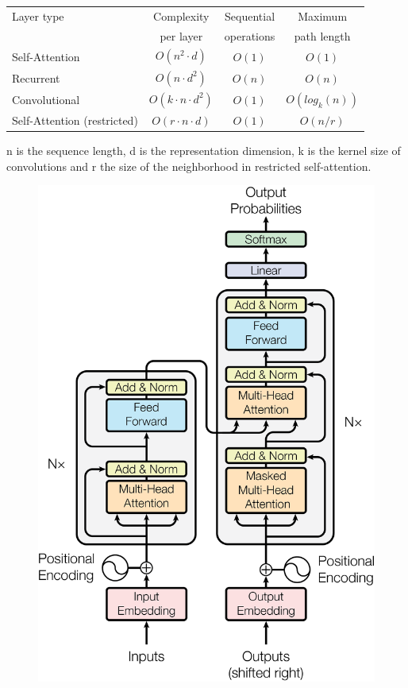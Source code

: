 \begin{table}
\centering
\begin{tabular}{l|ccc}
\toprule
Layer type        &   Complexity             &  Sequential & Maximum        \\
                  &   per layer              &  operations & path length    \\
\midrule
Self-Attention    & $O(n^2 \cdot d)$         & $O(1)$      & $O(1)$         \\
Recurrent         & $O(n \cdot d^2)$         & $O(n)$      & $O(n)$         \\
Convolutional     & $O(k \cdot n \cdot d^2)$ & $O(1)$      & $O(log_k (n))$ \\
Self-Attention (restricted) & $O(r \cdot n \cdot d)$       & $O(1)$ & $O(n/r)$  \\
\bottomrule
\end{tabular}
 {
	n is the sequence length, 
	d is the representation dimension, 
	k is the kernel size of convolutions and 
	r the size of the neighborhood in restricted self-attention.
}
\label{tab:layer_complexity_comp}
\end{table}


\begin{figure}[h]
	\centering
	\includegraphics[width=0.9\columnwidth]{../img/transformer_architecture.png}
	 {}
	\label{fig:transformer_architecture}
\end{figure}


